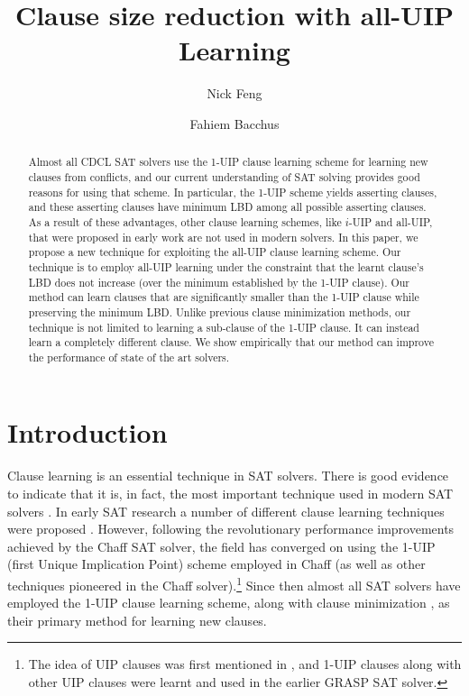 \documentclass[runningheads]{llncs}
\title{Clause size reduction with all-UIP Learning}
\author{Nick Feng \and Fahiem Bacchus}
\institute{Department of Computer Science, University of Toronto, Canada, 
  \email{\{fengnick,fbacchus\}@cs.toronto.edu}}
\newcommand{\sat}{SAT\xspace}
\begin{document}
\maketitle              %
% 
\begin{abstract}
    Almost all CDCL \sat solvers use the 1-UIP 
    clause learning scheme for learning new clauses from conflicts, 
    and our current understanding
    of \sat solving provides good reasons for using that scheme. In
    particular, the 1-UIP scheme yields asserting clauses, and these
    asserting clauses have minimum LBD among all possible asserting
    clauses. As a result of these advantages, other clause learning
    schemes, like $i$-UIP and all-UIP, that were proposed in early
    work are not used in modern solvers. In this paper, we propose a
    new technique for exploiting the all-UIP clause learning scheme. 
    Our technique is to employ all-UIP learning under the
    constraint that the learnt clause's LBD does not increase (over the
    minimum established by the 1-UIP clause). Our method can learn
    clauses that are significantly smaller than the 1-UIP clause while
    preserving the minimum LBD. Unlike previous clause minimization
    methods, our technique is not limited to learning a sub-clause of
    the 1-UIP clause. It can instead learn a completely different
    clause. We show empirically 
    that our method can improve the performance of state of the art solvers.
\end{abstract}

\section{Introduction}
Clause learning is an essential technique in \sat solvers. There is good
evidence to indicate that it is, in fact, the most important technique
used in modern \sat solvers \cite{DBLP:conf/sat/KatebiSS11}. In early
\sat research a number of different clause learning techniques were
proposed
\cite{DBLP:conf/iccad/ZhangMMM01,DBLP:conf/iccad/SilvaS96,DBLP:journals/tc/Marques-SilvaS99,DBLP:conf/aaai/BayardoS97}.
However, following the revolutionary performance improvements achieved
by the Chaff \sat solver, the field has converged on using the 1-UIP
(first Unique Implication Point) scheme
\cite{DBLP:conf/iccad/ZhangMMM01} employed in Chaff
\cite{DBLP:conf/dac/MoskewiczMZZM01} (as well as other techniques
pioneered in the Chaff solver).\footnote{The idea of UIP clauses was
  first mentioned in \cite{DBLP:journals/tc/Marques-SilvaS99}, and
  1-UIP clauses along with other UIP clauses were learnt and used in
  the earlier GRASP \sat solver.} Since then almost all \sat solvers
have employed the 1-UIP clause learning scheme, along with clause
minimization \cite{DBLP:conf/sat/SorenssonB09}, as their primary
method for learning new clauses.
\end{document}
